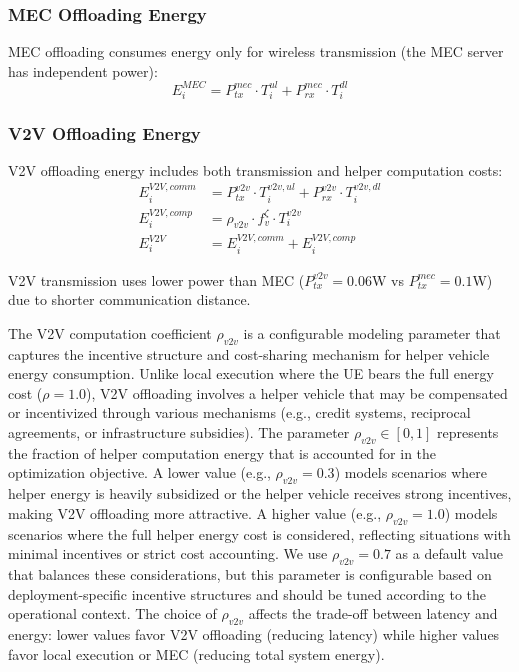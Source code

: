\documentclass[journal,twoside]{IEEEtran}
\begin{document}
\subsubsection{MEC Offloading Energy}
MEC offloading consumes energy only for wireless transmission (the MEC server has independent power):
\begin{equation}
E_i^{MEC} = P_{tx}^{mec} \cdot T_i^{ul} + P_{rx}^{mec} \cdot T_i^{dl}
\label{eq:energy_mec}
\end{equation}

\subsubsection{V2V Offloading Energy}
V2V offloading energy includes both transmission and helper computation costs:
    \begin{align}
E_i^{V2V,comm} &= P_{tx}^{v2v} \cdot T_i^{v2v,ul} + P_{rx}^{v2v} \cdot T_i^{v2v,dl} \label{eq:energy_v2v_comm}\\
E_i^{V2V,comp} &= \rho_{v2v} \cdot f_v^\zeta \cdot T_i^{v2v} \label{eq:energy_v2v_comp}\\
E_i^{V2V} &= E_i^{V2V,comm} + E_i^{V2V,comp} \label{eq:energy_v2v_total}
    \end{align}

V2V transmission uses lower power than MEC ($P_{tx}^{v2v} = 0.06$W vs $P_{tx}^{mec} = 0.1$W) due to shorter communication distance. 

The V2V computation coefficient $\rho_{v2v}$ is a configurable modeling parameter that captures the incentive structure and cost-sharing mechanism for helper vehicle energy consumption. Unlike local execution where the UE bears the full energy cost ($\rho = 1.0$), V2V offloading involves a helper vehicle that may be compensated or incentivized through various mechanisms (e.g., credit systems, reciprocal agreements, or infrastructure subsidies). The parameter $\rho_{v2v} \in [0, 1]$ represents the fraction of helper computation energy that is accounted for in the optimization objective. A lower value (e.g., $\rho_{v2v} = 0.3$) models scenarios where helper energy is heavily subsidized or the helper vehicle receives strong incentives, making V2V offloading more attractive. A higher value (e.g., $\rho_{v2v} = 1.0$) models scenarios where the full helper energy cost is considered, reflecting situations with minimal incentives or strict cost accounting. We use $\rho_{v2v} = 0.7$ as a default value that balances these considerations, but this parameter is configurable based on deployment-specific incentive structures and should be tuned according to the operational context. The choice of $\rho_{v2v}$ affects the trade-off between latency and energy: lower values favor V2V offloading (reducing latency) while higher values favor local execution or MEC (reducing total system energy).
\end{document}
